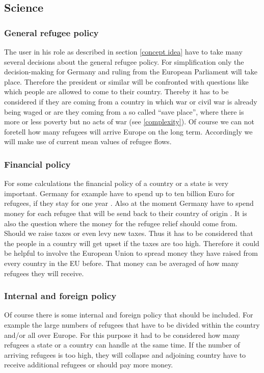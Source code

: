\documentclass{acm_proc_article-sp}
\begin{document}
\subsection{Science}
\subsubsection*{\textbf{General refugee policy}}
The user in his role as described in section \ref{concept idea} have to take many several decisions about the general refugee policy. For simplification only the decision-making for Germany and ruling from the European Parliament will take place. Therefore the president or similar will be confronted with questions like which people are allowed to come to their country. Thereby it has to be considered if they are coming from a country in which war or civil war is already being waged or are they coming from a so called ``save place'', where there is more or less poverty but no acts of war (see \ref{complexity}). Of course we can not foretell how many refugees will arrive Europe on the long term. Accordingly we will make use of current mean values of refugee flows. 


\subsubsection*{\textbf{Financial policy}}
For some calculations the financial policy of a country or a state is very important. Germany for example have to spend up to ten billion Euro for refugees, if they stay for one year \cite{finanzen}. Also at the moment Germany have to spend money for each refugee that will be send back to their country of origin \cite{auswanderung}. It is also the question where the money for the refugee relief should come from. Should we raise taxes or even levy new taxes. Thus it has to be considered that the people in a country will get upset if the taxes are too high. Therefore it could be helpful to involve the European Union to spread money they have raised from every country in the EU before. That money can be averaged of how many refugees they will receive. 

\subsubsection*{\textbf{Internal and foreign policy}}
Of course there is some internal and foreign policy that should be included. For example the large numbers of refugees that have to be divided within the country and/or all over Europe. For this purpose it had to be considered how many refugees a state or a country can handle at the same time. If the number of arriving refugees is too high, they will collapse and adjoining country have to receive additional refugees or should pay more money.
\end{document}
